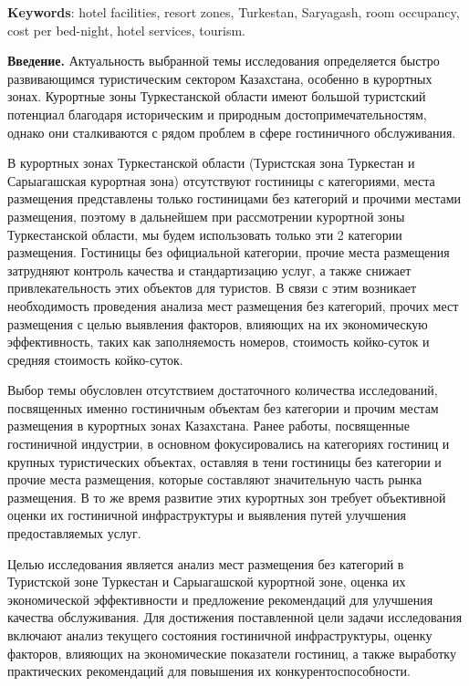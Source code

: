 {\bfseries Keywords}: hotel facilities, resort zones, Turkestan, Saryagash,
room occupancy, cost per bed-night, hotel services, tourism.

\begin{multicols}{2}
{\bfseries Введение.} Актуальность выбранной темы исследования определяется
быстро развивающимся туристическим сектором Казахстана, особенно в
курортных зонах. Курортные зоны Туркестанской области имеют большой
туристский потенциал благодаря историческим и природным
достопримечательностям, однако они сталкиваются с рядом проблем в сфере
гостиничного обслуживания.

В курортных зонах Туркестанской области (Туристская зона Туркестан и
Сарыагашская курортная зона) отсутствуют гостиницы с категориями, места
размещения представлены только гостиницами без категорий и прочими
местами размещения, поэтому в дальнейшем при рассмотрении курортной зоны
Туркестанской области, мы будем использовать только эти 2 категории
размещения. Гостиницы без официальной категории, прочие места размещения
затрудняют контроль качества и стандартизацию услуг, а также снижает
привлекательность этих объектов для туристов. В связи с этим возникает
необходимость проведения анализа мест размещения без категорий, прочих
мест размещения с целью выявления факторов, влияющих на их экономическую
эффективность, таких как заполняемость номеров, стоимость койко-суток и
средняя стоимость койко-суток.

Выбор темы обусловлен отсутствием достаточного количества исследований,
посвященных именно гостиничным объектам без категории и прочим местам
размещения в курортных зонах Казахстана. Ранее работы, посвященные
гостиничной индустрии, в основном фокусировались на категориях гостиниц
и крупных туристических объектах, оставляя в тени гостиницы без
категории и прочие места размещения, которые составляют значительную
часть рынка размещения. В то же время развитие этих курортных зон
требует объективной оценки их гостиничной инфраструктуры и выявления
путей улучшения предоставляемых услуг.

Целью исследования является анализ мест размещения без категорий в
Туристской зоне Туркестан и Сарыагашской курортной зоне, оценка их
экономической эффективности и предложение рекомендаций для улучшения
качества обслуживания. Для достижения поставленной цели задачи
исследования включают анализ текущего состояния гостиничной
инфраструктуры, оценку факторов, влияющих на экономические показатели
гостиниц, а также выработку практических рекомендаций для повышения их
конкурентоспособности.


\end{multicols}
